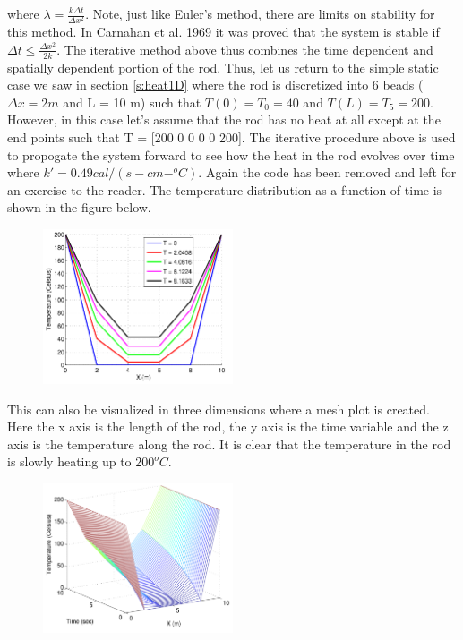 \begin{enumerate}
    where $\lambda = \frac{k\Delta t}{\Delta x^2}$. Note, just like
    Euler's method, there are limits on stability for this method. In
    Carnahan et al. 1969 it was proved that the system is stable if
    $\Delta t \leq \frac{\Delta x^2}{2 k}$. The iterative method above
    thus combines the time dependent and spatially dependent portion
    of the rod. Thus, let us return to the simple static case we saw
    in section \ref{s:heat1D} where the rod is discretized into 6
    beads ($\Delta x = 2 m$ and L = 10 m) such that $T(0) = T_0 = 40$
    and $T(L) = T_5 = 200$. However, in this case let's assume that
    the rod has no heat at all except at the end points
     such that T = [200 0
     0 0 0 200]. The iterative procedure above is used to
    propogate the system forward to see how the heat in the rod
    evolves over time where $k' = 0.49 cal/(s-cm-^oC)$. Again the code
    has been removed and left for an exercise to the reader. The
    temperature distribution as a function of time is shown in the
    figure below.

    \begin{figure}[H]
      \begin{center}
       \includegraphics[height=0.4\textwidth,width=0.5\textwidth]{Graphics/Heat_Rod_Time}
      \end{center}
    \end{figure}

    This can also be visualized in three dimensions where a mesh plot
    is created. Here the x axis is the length of the rod, the y axis
    is the time variable and the z axis is the temperature along the
    rod. It is clear that the temperature in the rod is slowly heating
    up to $200^o C$.

    \begin{figure}[H]
      \begin{center}
        \includegraphics[height=0.4\textwidth,width=0.5\textwidth]{Graphics/Heat_Time_Mesh}
      \end{center}
    \end{figure}


\end{enumerate}

